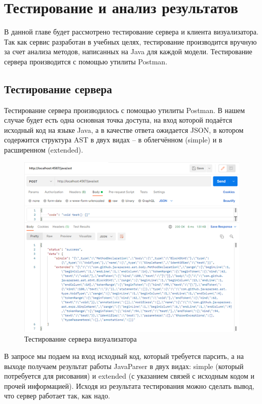 \chapter{Тестирование и анализ результатов} \label{ch6}
В данной главе будет рассмотрено тестирование сервера и клиента визуализатора. Так как сервис разработан в учебных целях, тестирование производится вручную за счет анализа методов, написанных на Java для каждой модели. Тестирование сервера производится с помощью утилиты Postman.
\section{Тестирование сервера} \label{ch6:sec1}
Тестирование сервера производилось с помощью утилиты Postman. В нашем случае будет есть одна основная точка доступа, на вход которой подаётся исходный код на языке Java, а в качестве ответа ожидается JSON, в котором содержится структура AST в двух видах – в облегчённом (simple) и в расширенном (extended).
\begin{figure}[ht!] 
	\center
	\includegraphics [scale=0.27] {my_folder/images/my/20}
	\caption{Тестирование сервера визуализатора} 
	\label{fig:20}  
\end{figure}
В запросе мы подаем на вход исходный код, который требуется парсить, а на выходе получаем результат работы JavaParser в двух видах: simple (который потребуется для рисования) и extended (с указанием связей с исходным кодом и прочей информацией). Исходя из результата тестирования можно сделать вывод, что сервер работает так, как надо.
